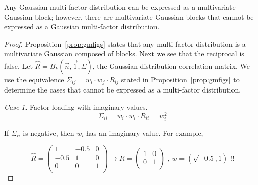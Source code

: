 \documentclass[11pt,fleqn]{book} %
\begin{document}
\begin{proposition}
	\label{prop:ibne}
	Any Gaussian multi-factor distribution can be expressed as a multivariate 
	Gaussian block; however, there are multivariate Gaussian blocks that cannot be 
	expressed as a Gaussian multi-factor distribution.
\end{proposition}
\begin{proof}
	Proposition~\ref{prop:gmfigs} states that any multi-factor distribution 
	is a multivariate Gaussian composed of blocks.
	Next we see that the reciprocal is false. Let 
	$\widehat{R} = B_k(\vec{n},\vec{1},\Sigma)$, the Gaussian distribution 
	correlation matrix. We use the equivalence 
	$\Sigma_{ij} = w_i \cdot w_j \cdot R_{ij}$ stated in 
	Proposition~\ref{prop:gmfigs} to determine the cases that cannot be 
	expressed as a multi-factor distribution.

	\emph{Case 1}. Factor loading with imaginary values.
	\begin{displaymath}
		\Sigma_{ii} = w_i \cdot w_i \cdot R_{ii} = w_i^2
	\end{displaymath}
	\begin{adjustwidth}{1cm}{0pt}
		If $\Sigma_{ii}$ is negative, then $w_i$ has an imaginary value.
		For example,
	\end{adjustwidth}
	\begin{displaymath}
		\widehat{R} = \left(
		\begin{array}{cc|c}
			1    & -0.5 & 0 \\
			-0.5 & 1    & 0 \\
			\hline
			0    & 0    & 1 \\
		\end{array}
		\right) 
		\longrightarrow
		R = \left(
		\begin{array}{cc}
			1 & 0 \\
			0 & 1 \\
		\end{array}
		\right)
		\text{ , }
		w = (\sqrt{-0.5}, 1)
		\text{ !!}
	\end{displaymath}
	

\end{proof}
\end{document}
